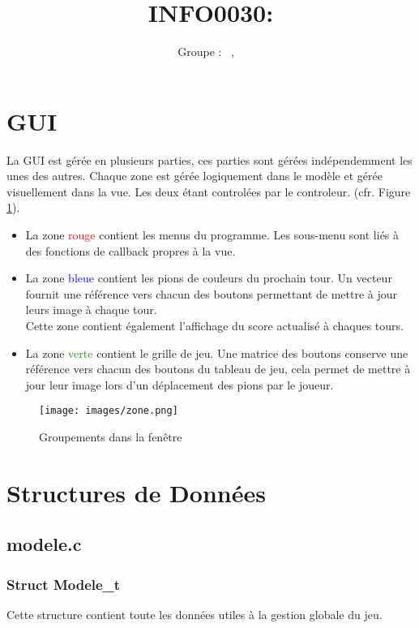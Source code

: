 \documentclass[a4paper, 11pt, oneside]{article}
\title{INFO0030: \intitule}
\author{Groupe \GrNbr : \PrenomUN~\textsc{\NomUN}, \PrenomDEUX~\textsc{\NomDEUX}}
\date{}
\begin{document}
\maketitle
\newpage
\tableofcontents
\newpage


\section{GUI}
La GUI est gérée en plusieurs parties, ces parties sont gérées indépendemment les unes des autres. Chaque zone est gérée logiquement dans le modèle et gérée visuellement dans la vue. Les deux étant controlées par le controleur.
(cfr. Figure \ref{fig:zone}).

\begin{itemize}
    \item La zone \textcolor{red}{rouge} contient les menus du programme. Les sous-menu sont liés à des fonctions de callback propres à la vue.
    \item La zone \textcolor{Blue}{bleue} contient les pions de couleurs du prochain tour. Un vecteur fournit une référence vers chacun des boutons permettant de mettre à jour leurs image à chaque tour. \\
    										Cette zone contient également l'affichage du score actualisé à chaques tours.
    \item La zone \textcolor{ForestGreen}{verte} contient le grille de jeu. Une matrice des boutons conserve une référence vers chacun des boutons du tableau de jeu, cela permet de mettre à jour leur image lors d'un déplacement des pions par le joueur.
\end{itemize}

\begin{figure}[h]
    \centering
    \texttt{[image: images/zone.png]}
    \caption{Groupements dans la fenêtre}
    \label{fig:zone}
\end{figure}

\section{Structures de Données}
\subsection{modele.c}
\subsubsection{Struct Modele\_t}
Cette structure contient toute les données utiles à la gestion globale du jeu.
\end{document}
